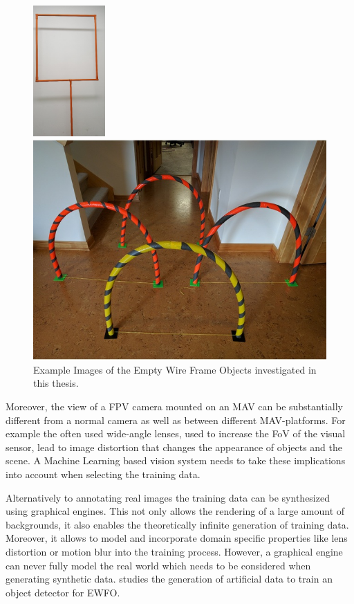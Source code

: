 \begin{figure}[bhtp]
	\centering
	\begin{minipage}{0.45\linewidth}
		\includegraphics[height=5cm]{fig/gate1}
	\end{minipage}\hfill
	\begin{minipage}{0.45\linewidth}
		\includegraphics[width=\textwidth]{fig/gate2}
	\end{minipage}
	\caption{Example Images of the Empty Wire Frame Objects investigated in this thesis. }
	\label{fig:gates}
\end{figure}

Moreover, the view of a \ac{FPV} camera mounted on an \ac{MAV} can be substantially different from a normal camera as well as between different \ac{MAV}-platforms. For example the often used wide-angle lenses, used to increase the \ac{FoV} of the visual sensor, lead to image distortion that changes the appearance of objects and the scene. A Machine Learning based vision system needs to take these implications into account when selecting the training data. 

Alternatively to annotating real images the training data can be synthesized using graphical engines. This not only allows the rendering of a large amount of backgrounds, it also enables the theoretically infinite generation of training data. Moreover, it allows to model and incorporate domain specific properties like lens distortion or motion blur into the training process. However, a graphical engine can never fully model the real world which needs to be considered when generating synthetic data.  studies the generation of artificial data to train an object detector for \ac{EWFO}.

